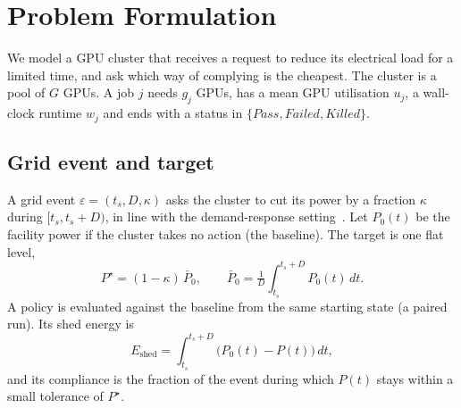 \providecommand{\RESULT}[1]{\textbf{[#1]}}   %
\section{Problem Formulation}
\label{sec:problem}
We model a GPU cluster that receives a request to reduce its electrical load for a limited time, and ask which way of complying is the cheapest.
The cluster is a pool of $G$ GPUs. A job $j$ needs $g_j$ GPUs, has a mean GPU utilisation $u_j$, a wall-clock runtime $w_j$ and ends with a status in $\{\textit{Pass}, \textit{Failed}, \textit{Killed}\}$.

\subsection{Grid event and target}
A grid event $\varepsilon=(t_s, D, \kappa)$ asks the cluster to cut its power by a fraction $\kappa$ during $[t_s, t_s{+}D)$, in line with the demand-response setting~\cite{liu13,zhou24}.
Let $P_0(t)$ be the facility power if the cluster takes no action (the baseline). The target is one flat level,
\begin{equation}
P^\star=(1-\kappa)\,\bar P_0,\qquad \bar P_0=\tfrac{1}{D}\int_{t_s}^{t_s+D}P_0(t)\,dt .
\end{equation}
A policy is evaluated against the baseline from the same starting state (a paired run). Its shed energy is
\begin{equation}
E_{\text{shed}}=\int_{t_s}^{t_s+D}\bigl(P_0(t)-P(t)\bigr)\,dt ,
\end{equation}
and its compliance is the fraction of the event during which $P(t)$ stays within a small tolerance of $P^\star$.

